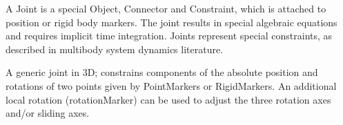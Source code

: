 \newpage
A Joint is a special Object, Connector and Constraint, which is attached to position or rigid body markers. The joint results in special algebraic equations and requires implicit time integration. Joints represent special constraints, as described in multibody system dynamics literature.


\label{sec:item:ObjectJointGeneric}
A generic joint in 3D; constrains components of the absolute position and rotations of two points given by PointMarkers or RigidMarkers. An additional local rotation (rotationMarker) can be used to adjust the three rotation axes and/or sliding axes.
\vspace{12pt}\\

